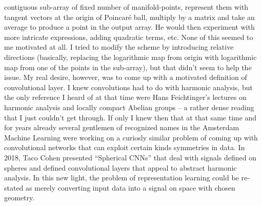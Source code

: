 contiguous sub-array of fixed number of manifold-points, represent them with
tangent vectors at the origin of Poincar\'e ball, multiply by a matrix and take
an average to produce a point in the output array. He would then experiment
with more intricate expressions, adding quadratic terms, etc. None of this seemed
to me motivated at all. I tried to modify the scheme by introducing relative
directions (basically, replacing the logarithmic map from origin with
logarithmic map from one of the points in the sub-array), but that didn't seem
to help the issue. My real desire, however, was to come up with a motivated
definition of convolutional layer. I knew convolutions had to do with harmonic analysis,
but the only reference I heard of at that time were Hans Feichtinger's lectures
on harmonic analysis and locally compact Abelian groups -- a rather dense
reading that I just couldn't get through. If only I knew then that at that same
time and for years already several gentlemen of recognized names in the
Amsterdam Machine Learning were working on a curiosly similar problem of coming
up with convolutional networks that can exploit certain kinds symmetries in
data. In 2018, Taco Cohen presented ``Spherical CNNs'' that deal with signals
defined on spheres and defined convolutional layers that appeal to abstract
harmonic analysis. In this new light, the problem of representation learning
could be re-stated as merely converting input data into a signal on space with
chosen geometry.
